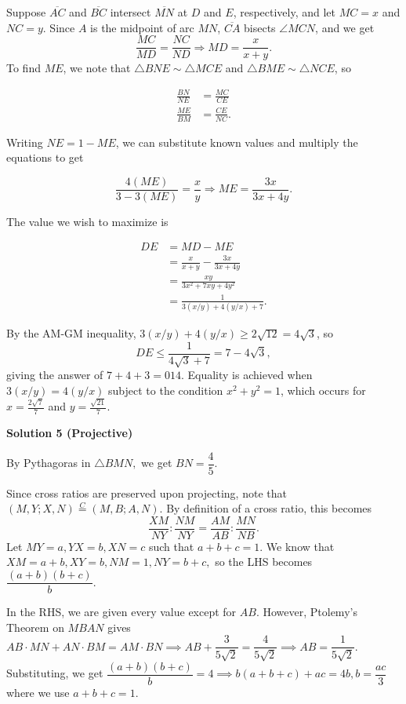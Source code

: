 \begin{enumerate}
 Suppose $\overline{AC}$ and $\overline{BC}$ intersect $\overline{MN}$ at $D$ and $E$, respectively, and let $MC = x$ and $NC = y$. Since $A$ is the midpoint of arc $MN$, $\overline{CA}$ bisects $\angle MCN$, and we get
 \[\frac{MC}{MD} = \frac{NC}{ND}\Rightarrow MD = \frac{x}{x + y}.\]To find $ME$, we note that $\triangle BNE\sim\triangle MCE$ and $\triangle BME\sim\triangle NCE$, so

 
 \begin{align*} \frac{BN}{NE} &= \frac{MC}{CE} \\ \frac{ME}{BM} &= \frac{CE}{NC}. \end{align*}


 Writing $NE = 1 - ME$, we can substitute known values and multiply the equations to get

 
 \[\frac{4(ME)}{3 - 3(ME)} = \frac{x}{y}\Rightarrow ME = \frac{3x}{3x + 4y}.\]

 The value we wish to maximize is

 
 \begin{align*} DE &= MD - ME \\ &= \frac{x}{x + y} - \frac{3x}{3x + 4y} \\ &= \frac{xy}{3x^2 + 7xy + 4y^2} \\ &= \frac{1}{3(x/y) + 4(y/x) + 7}. \end{align*}


 By the AM-GM inequality, $3(x/y) + 4(y/x)\geq 2\sqrt{12} = 4\sqrt{3}$, so
 \[DE\leq \frac{1}{4\sqrt{3} + 7} = 7 - 4\sqrt{3},\]giving the answer of $7 + 4 + 3 = \boxed{014}$. Equality is achieved when $3(x/y) = 4(y/x)$ subject to the condition $x^2 + y^2 = 1$, which occurs for $x = \frac{2\sqrt{7}}{7}$ and $y = \frac{\sqrt{21}}{7}$.

 



\textbf{Solution 5 (Projective)}

By Pythagoras in $\triangle BMN,$ we get $BN=\dfrac{4}{5}.$

 Since cross ratios are preserved upon projecting, note that $(M,Y;X,N)\stackrel{C}{=}(M,B;A,N).$ By definition of a cross ratio, this becomes 
 \[\dfrac{XM}{NY}:\dfrac{NM}{NY}=\dfrac{AM}{AB}:\dfrac{MN}{NB}.\] Let $MY=a,YX=b,XN=c$ such that $a+b+c=1.$ We know that $XM=a+b,XY=b,NM=1,NY=b+c,$ so the LHS becomes $\dfrac{(a+b)(b+c)}{b}.$

 In the RHS, we are given every value except for $AB.$ However, Ptolemy's Theorem on $MBAN$ gives $AB\cdot MN+AN\cdot BM=AM\cdot BN\implies AB+\dfrac{3}{5\sqrt{2}}=\dfrac{4}{5\sqrt{2}}\implies AB=\dfrac{1}{5\sqrt{2}}.$ Substituting, we get $\dfrac{(a+b)(b+c)}{b}=4\implies b(a+b+c)+ac=4b, b=\dfrac{ac}{3}$ where we use $a+b+c=1.$


\end{enumerate}
